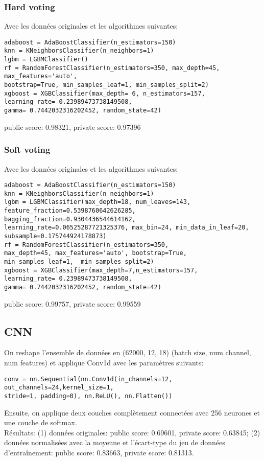\documentclass{article}
\begin{document}
\subsubsection{Hard voting} 
Avec les données originales et les algorithmes suivantes:  
\begin{verbatim}
adaboost = AdaBoostClassifier(n_estimators=150)
knn = KNeighborsClassifier(n_neighbors=1)
lgbm = LGBMClassifier()
rf = RandomForestClassifier(n_estimators=350, max_depth=45, max_features='auto', 
bootstrap=True, min_samples_leaf=1, min_samples_split=2)
xgboost = XGBClassifier(max_depth= 6, n_estimators=157,
learning_rate= 0.23989473738149508,
gamma= 0.7442032316202452, random_state=42)
\end{verbatim}
public score: 0.98321, private score: 0.97396 \\

\subsubsection{Soft voting} 
Avec les données originales et les algorithmes suivantes: 
\begin{verbatim}
adaboost = AdaBoostClassifier(n_estimators=150)
knn = KNeighborsClassifier(n_neighbors=1)
lgbm = LGBMClassifier(max_depth=18, num_leaves=143,
feature_fraction=0.5398760642626285, bagging_fraction=0.9304436544614162,
learning_rate=0.06525287721325376, max_bin=24, min_data_in_leaf=20,
subsample=0.175744924178873)
rf = RandomForestClassifier(n_estimators=350,
max_depth=45, max_features='auto', bootstrap=True,
min_samples_leaf=1,  min_samples_split=2)
xgboost = XGBClassifier(max_depth=7,n_estimators=157,
learning_rate= 0.23989473738149508,
gamma= 0.7442032316202452, random_state=42)
\end{verbatim}
public score: 0.99757, private score: 0.99559 \\

\subsection{CNN}
On reshape l'ensemble de données en (62000, 12, 18) (batch size, num channel, 
num features) et applique Conv1d avec les paramètres suivants: 
\begin{verbatim}
conv = nn.Sequential(nn.Conv1d(in_channels=12, out_channels=24,kernel_size=1, 
stride=1, padding=0), nn.ReLU(), nn.Flatten())
\end{verbatim}
Ensuite, on applique deux couches complètement connectées avec 256 neurones et 
une couche de softmax.\\
Résultats: (1) données originales: public score: 0.69601, private score: 
0.63845; (2) données normalisées avec la moyenne et l'écart-type du jeu de 
données d'entraînement: public score: 0.83663, private score: 0.81313. \\
\end{document}
